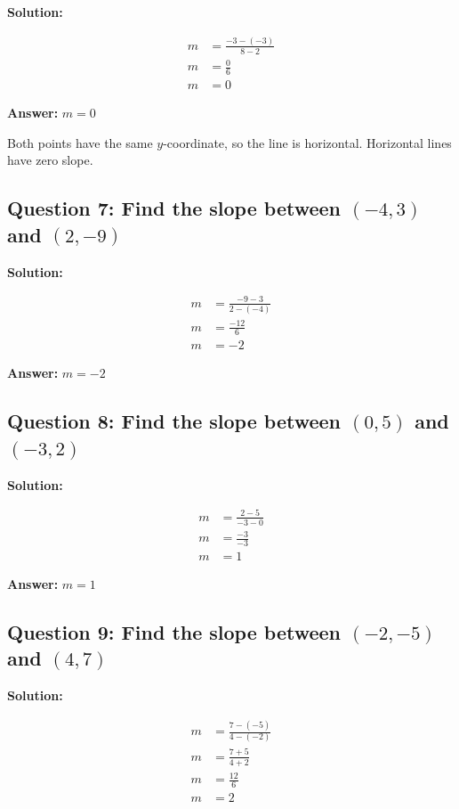 \documentclass[12pt]{article}
\begin{document}
\noindent\textbf{Solution:}

\begin{align*}
m &= \frac{-3 - (-3)}{8 - 2} \\
m &= \frac{0}{6} \\
m &= 0
\end{align*}

\textbf{Answer: } $m = 0$

Both points have the same $y$-coordinate, so the line is horizontal. Horizontal lines have zero slope.

\vspace{0.3cm}

\subsection*{Question 7: Find the slope between $(-4, 3)$ and $(2, -9)$}

\noindent\textbf{Solution:}

\begin{align*}
m &= \frac{-9 - 3}{2 - (-4)} \\
m &= \frac{-12}{6} \\
m &= -2
\end{align*}

\textbf{Answer: } $m = -2$

\vspace{0.3cm}

\subsection*{Question 8: Find the slope between $(0, 5)$ and $(-3, 2)$}

\noindent\textbf{Solution:}

\begin{align*}
m &= \frac{2 - 5}{-3 - 0} \\
m &= \frac{-3}{-3} \\
m &= 1
\end{align*}

\textbf{Answer: } $m = 1$

\vspace{0.3cm}

\subsection*{Question 9: Find the slope between $(-2, -5)$ and $(4, 7)$}

\noindent\textbf{Solution:}

\begin{align*}
m &= \frac{7 - (-5)}{4 - (-2)} \\
m &= \frac{7 + 5}{4 + 2} \\
m &= \frac{12}{6} \\
m &= 2
\end{align*}
\end{document}
